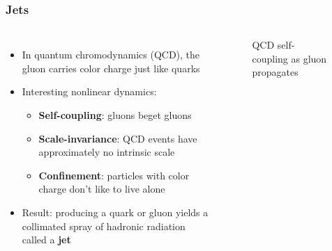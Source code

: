 \documentclass{beamer}
\begin{document}
	\begin{frame}
		\frametitle{Jets}

		\begin{columns}
		\begin{itemize}
			\item In quantum chromodynamics (QCD), the gluon carries color charge just like quarks

			\item Interesting nonlinear dynamics:
			\begin{itemize}
				\item \textbf{Self-coupling}: gluons beget gluons

				\item \textbf{Scale-invariance}: QCD events have approximately no intrinsic scale

				\item \textbf{Confinement}: particles with color charge don't like to live alone
			\end{itemize}

			\item Result: producing a quark or gluon yields a collimated spray of hadronic radiation called a \textbf{jet}
		\end{itemize}

		\begin{figure}

			\caption{QCD self-coupling as gluon propagates}
		\end{figure}
		\end{columns}
	\end{frame}
\end{document}
